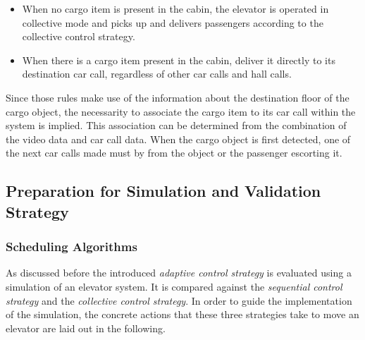\begin{itemize}
    \item When no cargo item is present in the cabin, the elevator is operated in collective mode and picks up and delivers passengers according to the collective control strategy.
    \item When there is a cargo item present in the cabin, deliver it directly to its destination car call, regardless of other car calls and hall calls.
\end{itemize}

Since those rules make use of the information about the destination floor of the cargo object, the necessarity to associate the cargo item to its car call within the system is implied.
This association can be determined from the combination of the video data and car call data.
When the cargo object is first detected, one of the next car calls made must by from the object or the passenger escorting it.

\subsection{Preparation for Simulation and Validation Strategy}

\subsubsection{Scheduling Algorithms}

As discussed before the introduced \emph{adaptive control strategy} is evaluated using a simulation of an elevator system. 
It is compared against the \emph{sequential control strategy} and the \emph{collective control strategy}.
In order to guide the implementation of the simulation, the concrete actions that these three strategies take to move an elevator are laid out in the following.

